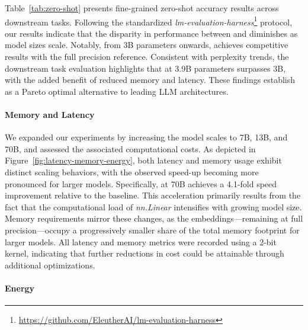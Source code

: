 Table~\ref{tab:zero-shot} presents fine-grained zero-shot accuracy results across downstream tasks. Following the standardized \emph{lm-evaluation-harness}\footnote{\url{https://github.com/EleutherAI/lm-evaluation-harness}} protocol, our results indicate that the disparity in performance between  and  diminishes as model sizes scale. Notably, from 3B parameters onwards,  achieves competitive results with the full precision reference. Consistent with perplexity trends, the downstream task evaluation highlights that  at 3.9B parameters surpasses  3B, with the added benefit of reduced memory and latency. These findings establish  as a Pareto optimal alternative to leading LLM architectures.

\paragraph{Memory and Latency}

We expanded our experiments by increasing the model scales to 7B, 13B, and 70B, and assessed the associated computational costs. As depicted in Figure~\ref{fig:latency-memory-energy}, both latency and memory usage exhibit distinct scaling behaviors, with the observed speed-up becoming more pronounced for larger models. Specifically,  at 70B achieves a 4.1-fold speed improvement relative to the  baseline. This acceleration primarily results from the fact that the computational load of \emph{nn.Linear} intensifies with growing model size. Memory requirements mirror these changes, as the embeddings—remaining at full precision—occupy a progressively smaller share of the total memory footprint for larger models. All latency and memory metrics were recorded using a 2-bit kernel, indicating that further reductions in cost could be attainable through additional optimizations.

\paragraph{Energy}

